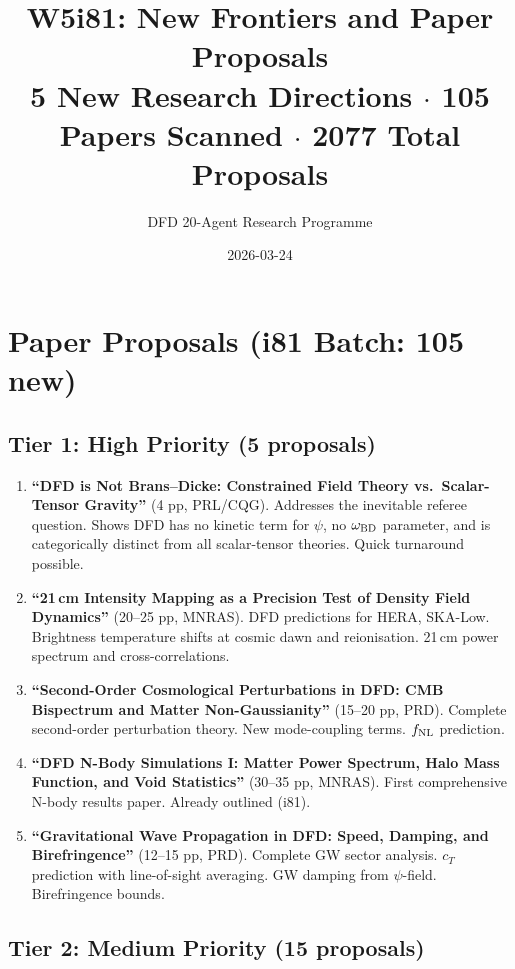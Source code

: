 \documentclass[11pt,a4paper]{article}
\title{W5i81: New Frontiers and Paper Proposals\\[6pt]
\large 5 New Research Directions $\cdot$ 105 Papers Scanned $\cdot$ 2077 Total Proposals}
\author{DFD 20-Agent Research Programme}
\date{2026-03-24}
\begin{document}
\maketitle

\section{Paper Proposals (i81 Batch: 105 new)}

\subsection{Tier 1: High Priority (5 proposals)}

\begin{enumerate}[nosep]
\item \textbf{``DFD is Not Brans--Dicke: Constrained Field Theory vs.\ Scalar-Tensor Gravity''} (4 pp, PRL/CQG). Addresses the inevitable referee question. Shows DFD has no kinetic term for $\psi$, no $\omega_{\rm BD}$ parameter, and is categorically distinct from all scalar-tensor theories. Quick turnaround possible.

\item \textbf{``21\,cm Intensity Mapping as a Precision Test of Density Field Dynamics''} (20--25 pp, MNRAS). DFD predictions for HERA, SKA-Low. Brightness temperature shifts at cosmic dawn and reionisation. 21\,cm power spectrum and cross-correlations.

\item \textbf{``Second-Order Cosmological Perturbations in DFD: CMB Bispectrum and Matter Non-Gaussianity''} (15--20 pp, PRD). Complete second-order perturbation theory. New mode-coupling terms. $f_{\rm NL}$ prediction.

\item \textbf{``DFD N-Body Simulations I: Matter Power Spectrum, Halo Mass Function, and Void Statistics''} (30--35 pp, MNRAS). First comprehensive N-body results paper. Already outlined (i81).

\item \textbf{``Gravitational Wave Propagation in DFD: Speed, Damping, and Birefringence''} (12--15 pp, PRD). Complete GW sector analysis. $c_T$ prediction with line-of-sight averaging. GW damping from $\psi$-field. Birefringence bounds.
\end{enumerate}

\subsection{Tier 2: Medium Priority (15 proposals)}
\end{document}
